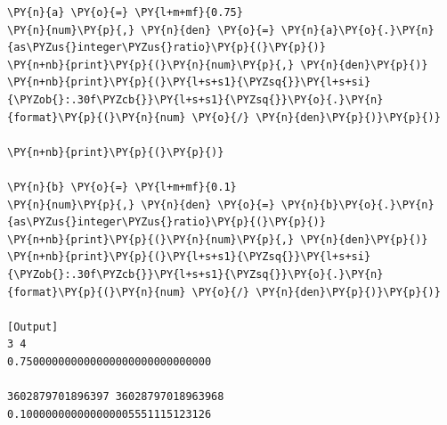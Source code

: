 \begin{Verbatim}[label=\makebox{\url{https://github.com/lucabaldini/cmepda/tree/master/slides/latex/snippets/float.py}},commandchars=\\\{\}]
\PY{n}{a} \PY{o}{=} \PY{l+m+mf}{0.75}
\PY{n}{num}\PY{p}{,} \PY{n}{den} \PY{o}{=} \PY{n}{a}\PY{o}{.}\PY{n}{as\PYZus{}integer\PYZus{}ratio}\PY{p}{(}\PY{p}{)}
\PY{n+nb}{print}\PY{p}{(}\PY{n}{num}\PY{p}{,} \PY{n}{den}\PY{p}{)}
\PY{n+nb}{print}\PY{p}{(}\PY{l+s+s1}{\PYZsq{}}\PY{l+s+si}{\PYZob{}:.30f\PYZcb{}}\PY{l+s+s1}{\PYZsq{}}\PY{o}{.}\PY{n}{format}\PY{p}{(}\PY{n}{num} \PY{o}{/} \PY{n}{den}\PY{p}{)}\PY{p}{)}

\PY{n+nb}{print}\PY{p}{(}\PY{p}{)}

\PY{n}{b} \PY{o}{=} \PY{l+m+mf}{0.1}
\PY{n}{num}\PY{p}{,} \PY{n}{den} \PY{o}{=} \PY{n}{b}\PY{o}{.}\PY{n}{as\PYZus{}integer\PYZus{}ratio}\PY{p}{(}\PY{p}{)}
\PY{n+nb}{print}\PY{p}{(}\PY{n}{num}\PY{p}{,} \PY{n}{den}\PY{p}{)}
\PY{n+nb}{print}\PY{p}{(}\PY{l+s+s1}{\PYZsq{}}\PY{l+s+si}{\PYZob{}:.30f\PYZcb{}}\PY{l+s+s1}{\PYZsq{}}\PY{o}{.}\PY{n}{format}\PY{p}{(}\PY{n}{num} \PY{o}{/} \PY{n}{den}\PY{p}{)}\PY{p}{)}

[Output]
3 4
0.750000000000000000000000000000

3602879701896397 36028797018963968
0.100000000000000005551115123126
\end{Verbatim}